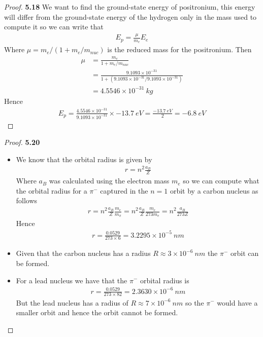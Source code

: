 \documentclass[11pt]{article}
\theoremstyle{definition}
\begin{document}
\cleardoublepage
\begin{proof}{\textbf{5.18}}
    We want to find the ground-state energy of positronium, this energy will
    differ from the ground-state energy of the hydrogen only in the mass used
    to compute it so we can write that
    \begin{align*}
        E_p = \frac{\mu}{m_e}E_e
    \end{align*}
    Where $\mu = m_e/(1 + m_e/m_{nuc})$ is the reduced mass for the positronium.
    Then
    \begin{align*}
        \mu &= \frac{m_e}{1 + m_e/m_{nuc}}\\
        &= \frac{9.1093\times 10^{-31}}
        {1 + (9.1093\times 10^{-31}/9.1093\times 10^{-31})}\\
        &= 4.5546 \times 10^{-31}~kg
    \end{align*}
    Hence
    \begin{align*}
        E_p = \frac{4.5546 \times 10^{-31}}{9.1093\times 10^{-31}} \times -13.7~eV
         = \frac{-13.7~eV}{2}
        = -6.8~eV 
    \end{align*}

\end{proof}
\begin{proof}{\textbf{5.20}}
\begin{itemize}
    \item [(a)] We know that the orbital radius is given by
    \begin{align*}
        r = n^2\frac{a_B}{Z}
    \end{align*}
    Where $a_B$ was calculated using the electron mass $m_e$ so we can compute
    what the orbital radius for a $\pi^-$ captured in the $n = 1$ orbit by
    a carbon nucleus as follows
    \begin{align*}
        r = n^2\frac{a_B}{Z}\frac{m_e}{m_\pi}
        = n^2\frac{a_B}{Z}\frac{m_e}{273 m_e}
        = n^2\frac{a_B}{273 Z}
    \end{align*}
    Hence
    \begin{align*}
        r = \frac{0.0529}{273 \times 6} = 3.2295 \times 10^{-5}~nm
    \end{align*}
    \item [(a)] Given that the carbon nucleus has a radius
    $R \approx 3\times 10^{-6}~nm$ the $\pi^-$ orbit can be formed.
    \item [(c)] For a lead nucleus we have that the $\pi^-$ orbital radius is 
    \begin{align*}
        r = \frac{0.0529}{273 \times 82} = 2.3630\times 10^{-6}~nm
    \end{align*}
    But the lead nucleus has a radius of $R \approx 7 \times 10^{-6}~nm$
    so the $\pi^-$ would have a smaller orbit and hence the orbit cannot be
    formed.
\end{itemize}
\end{proof}
\end{document}
